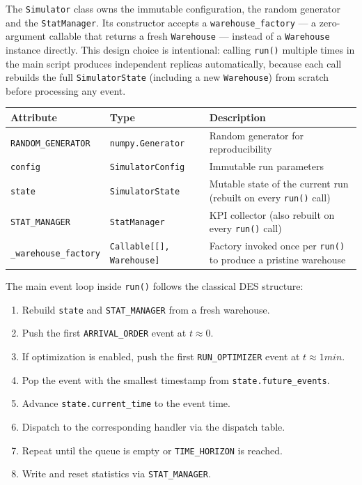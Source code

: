 \documentclass[a4paper,10pt]{article}
\begin{document}
The \texttt{Simulator} class owns the immutable configuration, the random generator and the \texttt{StatManager}. Its constructor accepts a \texttt{warehouse\_factory} — a zero-argument callable that returns a fresh \texttt{Warehouse} — instead of a \texttt{Warehouse} instance directly. This design choice is intentional: calling \texttt{run()} multiple times in the main script produces independent replicas automatically, because each call rebuilds the full \texttt{SimulatorState} (including a new \texttt{Warehouse}) from scratch before processing any event.

\vspace{0.4em}
\begin{tabularx}{\textwidth}{l l X}
\toprule
\textbf{Attribute} & \textbf{Type} & \textbf{Description} \\
\midrule
\texttt{RANDOM\_GENERATOR}    & \texttt{numpy.Generator}          & Random generator for reproducibility \\
\texttt{config}               & \texttt{SimulatorConfig}          & Immutable run parameters \\
\texttt{state}                & \texttt{SimulatorState}           & Mutable state of the current run (rebuilt on every \texttt{run()} call) \\
\texttt{STAT\_MANAGER}        & \texttt{StatManager}              & KPI collector (also rebuilt on every \texttt{run()} call) \\
\texttt{\_warehouse\_factory} & \texttt{Callable[[], Warehouse]}  & Factory invoked once per \texttt{run()} to produce a pristine warehouse \\
\bottomrule
\end{tabularx}

\vspace{0.4em}
The main event loop inside \texttt{run()} follows the classical DES structure:
\begin{enumerate}[noitemsep]
    \item Rebuild \texttt{state} and \texttt{STAT\_MANAGER} from a fresh warehouse.
    \item Push the first \texttt{ARRIVAL\_ORDER} event at $t \approx 0$.
    \item If optimization is enabled, push the first \texttt{RUN\_OPTIMIZER} event at  $t \approx 1 min$.
    \item Pop the event with the smallest timestamp from \texttt{state.future\_events}.
    \item Advance \texttt{state.current\_time} to the event time.
    \item Dispatch to the corresponding handler via the dispatch table.
    \item Repeat until the queue is empty or \texttt{TIME\_HORIZON} is reached.
    \item Write and reset statistics via \texttt{STAT\_MANAGER}.
\end{enumerate}
\end{document}
